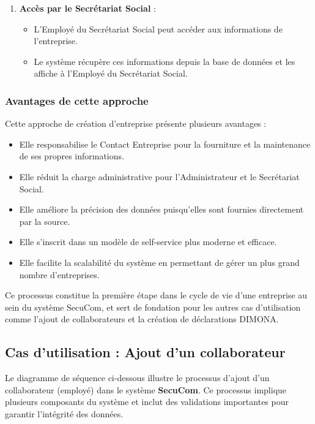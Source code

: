 \begin{enumerate}
  \item \textbf{Accès par le Secrétariat Social} :
    \begin{itemize}[leftmargin=*,label=\textcolor{darkgray}{$\bullet$},itemsep=0.3em]
      \item L'Employé du Secrétariat Social peut accéder aux informations de l'entreprise.
      \item Le système récupère ces informations depuis la base de données et les affiche à l'Employé du Secrétariat Social.
    \end{itemize}
\end{enumerate}

\subsubsection{Avantages de cette approche}

Cette approche de création d'entreprise présente plusieurs avantages :
\begin{itemize}
  \item Elle responsabilise le Contact Entreprise pour la fourniture et la maintenance de ses propres informations.
  \item Elle réduit la charge administrative pour l'Administrateur et le Secrétariat Social.
  \item Elle améliore la précision des données puisqu'elles sont fournies directement par la source.
  \item Elle s'inscrit dans un modèle de self-service plus moderne et efficace.
  \item Elle facilite la scalabilité du système en permettant de gérer un plus grand nombre d'entreprises.
\end{itemize}

Ce processus constitue la première étape dans le cycle de vie d'une entreprise au sein du système SecuCom, et sert de fondation pour les autres cas d'utilisation comme l'ajout de collaborateurs et la création de déclarations DIMONA.

\subsection{Cas d'utilisation : Ajout d'un collaborateur}

\noindent Le diagramme de séquence ci-dessous illustre le processus d'ajout d'un collaborateur (employé) dans le système \textbf{SecuCom}. Ce processus implique plusieurs composants du système et inclut des validations importantes pour garantir l'intégrité des données.

